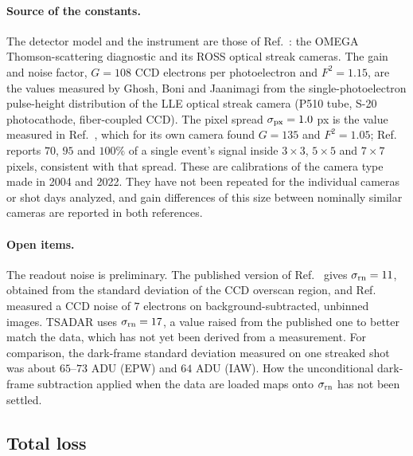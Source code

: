 \documentclass[11pt]{article}
\begin{document}
\paragraph{Source of the constants.} The detector model and the instrument are those of
Ref.~\cite{swadling2022}: the OMEGA Thomson-scattering diagnostic and its ROSS optical
streak cameras. The gain and noise factor, $G=108$ CCD electrons per photoelectron and
$F^2=1.15$, are the values measured by Ghosh, Boni and Jaanimagi \cite{ghosh2004} from the
single-photoelectron pulse-height distribution of the LLE optical streak camera (P510
tube, S-20 photocathode, fiber-coupled CCD). The pixel spread $\sigma_{\rm px}=1.0$ px is
the value measured in Ref.~\cite{swadling2022}, which for its own camera found $G=135$
and $F^2=1.05$; Ref.~\cite{ghosh2004} reports $70$, $95$ and $100\%$ of a single event's
signal inside $3\times3$, $5\times5$ and $7\times7$ pixels, consistent with that spread.
These are calibrations of the camera type made in 2004 and 2022. They have not been
repeated for the individual cameras or shot days analyzed, and gain differences of this
size between nominally similar cameras are reported in both references.

\paragraph{Open items.} The readout noise is preliminary. The published version of
Ref.~\cite{swadling2022} gives $\sigma_{\rm rn}=11$, obtained from the standard deviation
of the CCD overscan region, and Ref.~\cite{ghosh2004} measured a CCD noise of $7$
electrons on background-subtracted, unbinned images. TSADAR uses $\sigma_{\rm rn}=17$, a
value raised from the published one to better match the data, which has not yet been
derived from a measurement. For comparison, the dark-frame standard deviation measured on
one streaked shot was about $65$--$73$ ADU (EPW) and $64$ ADU (IAW). How the
unconditional dark-frame subtraction applied when the data are loaded maps onto
$\sigma_{\rm rn}$ has not been settled.

\subsection{Total loss}
\end{document}
